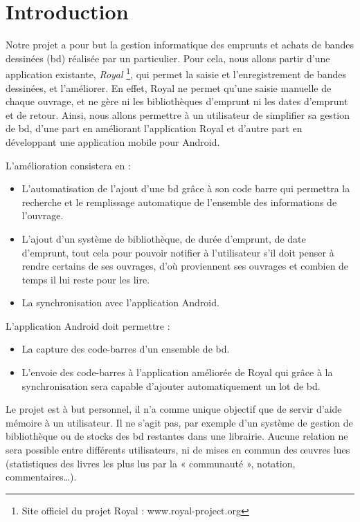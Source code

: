 \part*{Introduction}
Notre projet a pour but la gestion informatique des emprunts et achats de bandes dessinées (bd) réalisée par un particulier.
Pour cela, nous allons partir d'une application existante, \emph{Royal}
\footnote{Site officiel du projet Royal : www.royal-project.org}, qui permet la saisie et l'enregistrement de bandes dessinées, et l'améliorer.
En effet, Royal ne permet qu'une saisie manuelle de chaque ouvrage, et ne gère ni les bibliothèques d'emprunt ni les dates d'emprunt et de retour. Ainsi, nous allons permettre à un utilisateur de simplifier sa gestion de bd, d'une part en améliorant l'application Royal et d'autre part en développant une application mobile pour Android.

L'amélioration consistera en :
\begin{itemize}
\item L'automatisation de l'ajout d'une bd grâce à son code barre qui permettra la recherche et le remplissage automatique de l'ensemble des informations de l'ouvrage.
\item L'ajout d'un système de bibliothèque, de durée d'emprunt, de date d'emprunt, tout cela pour pouvoir notifier à l'utilisateur s'il doit penser à rendre certains de ses ouvrages, d'où proviennent ses ouvrages et combien de temps il lui reste pour les lire.
\item La synchronisation avec l'application Android.
\end{itemize}

L'application Android doit permettre :
\begin{itemize}
\item La capture des code-barres d'un ensemble de bd.
\item L'envoie des code-barres à l'application améliorée de Royal qui grâce à la synchronisation sera capable d'ajouter automatiquement un lot de bd.
\end{itemize}

Le projet est à but personnel, il n'a comme unique objectif que de servir d'aide mémoire à un utilisateur.
Il ne s'agit pas, par exemple d'un système de gestion de bibliothèque ou de stocks des bd restantes dans une librairie.
Aucune relation ne sera possible entre différents utilisateurs, ni de mises en commun des œuvres lues
(statistiques des livres les plus lus par la « communauté », notation, commentaires…).
